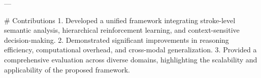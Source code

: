 ---

# Contributions  
1. Developed a unified framework integrating stroke-level semantic analysis, hierarchical reinforcement learning, and context-sensitive decision-making.  
2. Demonstrated significant improvements in reasoning efficiency, computational overhead, and cross-modal generalization.  
3. Provided a comprehensive evaluation across diverse domains, highlighting the scalability and applicability of the proposed framework.

